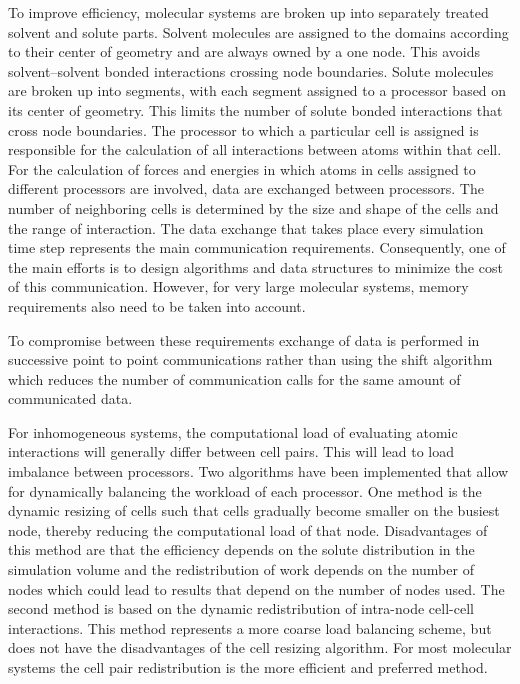 To improve efficiency, molecular systems are broken up into separately
treated solvent and solute parts. Solvent molecules are assigned to
the domains according to their center of geometry and are always owned
by a one node. This avoids solvent--solvent bonded interactions
crossing node boundaries.  Solute molecules are broken up into
segments, with each segment assigned to a processor based on its
center of geometry.  This limits the number of solute bonded
interactions that cross node boundaries.  The processor to which a
particular cell is assigned is responsible for the calculation of all
interactions between atoms within that cell.  For the calculation of
forces and energies in which atoms in cells assigned to different
processors are involved, data are exchanged between processors. The
number of neighboring cells is determined by the size and shape of the
cells and the range of interaction. The data exchange that takes place
every simulation time step represents the main communication
requirements.  Consequently, one of the main efforts is to design
algorithms and data structures to minimize the cost of this
communication. However, for very large molecular systems, memory
requirements also need to be taken into account.

To compromise between these requirements exchange of data is performed
in successive point to point communications rather than using the
shift algorithm which reduces the number of communication calls
for the same amount of communicated data.

For inhomogeneous systems, the computational load of evaluating 
atomic interactions will generally differ between cell pairs. 
This will lead to load imbalance between processors.
Two algorithms have been implemented that allow for dynamically 
balancing the workload of each processor.
One method is the dynamic resizing of cells such that cells gradually
become smaller on the busiest node, thereby reducing the computational
load of that node. Disadvantages of this method are that the 
efficiency depends on the solute distribution in the simulation volume
and the redistribution of work depends on the number of nodes which
could lead to results that depend on the number of nodes used.
The second method is based on the dynamic redistribution of intra-node
cell-cell interactions. This method represents a more coarse load
balancing scheme, but does not have the disadvantages of the cell
resizing algorithm. For most molecular systems the cell pair
redistribution is the more efficient and preferred  method.

